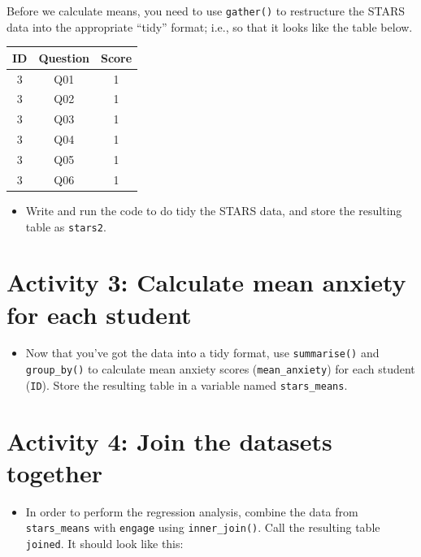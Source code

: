 \documentclass[]{book}
\providecommand{\tightlist}{%
  \setlength{\itemsep}{0pt}\setlength{\parskip}{0pt}}
\begin{document}
Before we calculate means, you need to use \texttt{gather()} to restructure the STARS data into the appropriate ``tidy'' format; i.e., so that it looks like the table below.

\begin{tabular}{c|c|c}
\hline
ID & Question & Score\\
\hline
3 & Q01 & 1\\
\hline
3 & Q02 & 1\\
\hline
3 & Q03 & 1\\
\hline
3 & Q04 & 1\\
\hline
3 & Q05 & 1\\
\hline
3 & Q06 & 1\\
\hline
\end{tabular}

\begin{itemize}
\tightlist
\item
  Write and run the code to do tidy the STARS data, and store the resulting table as \texttt{stars2}.
\end{itemize}

\hypertarget{activity-3-calculate-mean-anxiety-for-each-student}{%
\section{Activity 3: Calculate mean anxiety for each student}\label{activity-3-calculate-mean-anxiety-for-each-student}}

\begin{itemize}
\tightlist
\item
  Now that you've got the data into a tidy format, use \texttt{summarise()} and \texttt{group\_by()} to calculate mean anxiety scores (\texttt{mean\_anxiety}) for each student (\texttt{ID}). Store the resulting table in a variable named \texttt{stars\_means}.
\end{itemize}

\hypertarget{activity-4-join-the-datasets-together}{%
\section{Activity 4: Join the datasets together}\label{activity-4-join-the-datasets-together}}

\begin{itemize}
\tightlist
\item
  In order to perform the regression analysis, combine the data from \texttt{stars\_means} with \texttt{engage} using \texttt{inner\_join()}. Call the resulting table \texttt{joined}. It should look like this:
\end{itemize}
\end{document}
